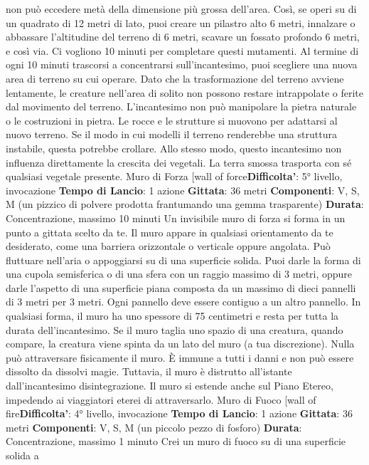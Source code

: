 \begin{multicols}{2}
non può eccedere metà della dimensione più grossa
dell’area. Così, se operi su di un quadrato di 12 metri di
lato, puoi creare un pilastro alto 6 metri, innalzare o
abbassare l’altitudine del terreno di 6 metri, scavare un
fossato profondo 6 metri, e così via. Ci vogliono 10
minuti per completare questi mutamenti.
Al termine di ogni 10 minuti trascorsi a concentrarsi
sull’incantesimo, puoi scegliere una nuova area di
terreno su cui operare.
Dato che la trasformazione del terreno avviene
lentamente, le creature nell’area di solito non possono
restare intrappolate o ferite dal movimento del terreno.
L’incantesimo non può manipolare la pietra naturale o
le costruzioni in pietra. Le rocce e le strutture si
muovono per adattarsi al nuovo terreno. Se il modo in
cui modelli il terreno renderebbe una struttura instabile,
questa potrebbe crollare.
Allo stesso modo, questo incantesimo non influenza
direttamente la crescita dei vegetali. La terra smossa
trasporta con sé qualsiasi vegetale presente.
Muro di Forza
[wall of force\textbf{Difficolta'}:
5° livello, invocazione
\textbf{Tempo di Lancio}: 1 azione
\textbf{Gittata}: 36 metri
\textbf{Componenti}: V, S, M (un pizzico di polvere prodotta
frantumando una gemma trasparente)
\textbf{Durata}: Concentrazione, massimo 10 minuti
Un invisibile muro di forza si forma in un punto a gittata
scelto da te. Il muro appare in qualsiasi orientamento
da te desiderato, come una barriera orizzontale o
verticale oppure angolata. Può fluttuare nell’aria o
appoggiarsi su di una superficie solida. Puoi darle la
forma di una cupola semisferica o di una sfera con un
raggio massimo di 3 metri, oppure darle l’aspetto di una
superficie piana composta da un massimo di dieci
pannelli di 3 metri per 3 metri. Ogni pannello deve
essere contiguo a un altro pannello. In qualsiasi forma,
il muro ha uno spessore di 75 centimetri e resta per
tutta la durata dell’incantesimo. Se il muro taglia uno
spazio di una creatura, quando compare, la creatura
viene spinta da un lato del muro (a tua discrezione).
Nulla può attraversare fisicamente il muro. È immune a
tutti i danni e non può essere dissolto da dissolvi magie.
Tuttavia, il muro è distrutto all’istante dall’incantesimo
disintegrazione. Il muro si estende anche sul Piano
Etereo, impedendo ai viaggiatori eterei di attraversarlo.
Muro di Fuoco
[wall of fire\textbf{Difficolta'}:
4° livello, invocazione
\textbf{Tempo di Lancio}: 1 azione
\textbf{Gittata}: 36 metri
\textbf{Componenti}: V, S, M (un piccolo pezzo di fosforo)
\textbf{Durata}: Concentrazione, massimo 1 minuto
Crei un muro di fuoco su di una superficie solida a

\end{multicols}
